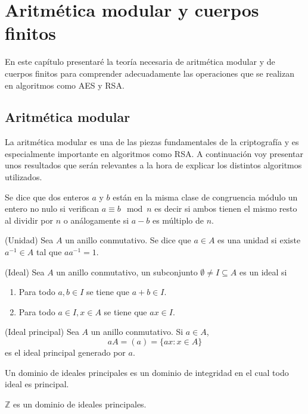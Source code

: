 \chapter{Aritmética modular y cuerpos finitos}
\label{chap:tres}

En este capítulo presentaré la teoría necesaria de aritmética modular y de cuerpos finitos para comprender adecuadamente las operaciones que se realizan en algoritmos como AES y RSA.

\section{Aritmética modular}
La aritmética modular es una de las piezas fundamentales de la criptografía y es especialmente importante en algoritmos como RSA. A continuación voy presentar unos resultados  que serán relevantes a la hora de explicar los distintos algoritmos utilizados.
\begin{definicion}
	Se dice que dos enteros $a$ y $b$ están en la misma clase de congruencia módulo un entero no nulo si verifican $a \equiv b \mod n$ es decir si ambos tienen el mismo resto al dividir por $n$ o análogamente si $a-b$ es múltiplo de $n$.
\end{definicion}
\begin{definicion}
	(Unidad) Sea $A$ un anillo conmutativo. Se dice que $a\in A$ es una unidad si existe $a^{-1} \in A$ tal que $aa^{-1}=1$.
\end{definicion}
\begin{definicion}
	(Ideal) Sea $A$ un anillo conmutativo, un subconjunto $\emptyset \neq I \subseteq A$ es un ideal si
	\begin{enumerate}
		\item Para todo $a, b \in I$ se tiene que $a+b \in I$.
		\item Para todo $a\in I,x\in A$ se tiene que $ax\in I$.
	\end{enumerate}
\end{definicion}
\begin{definicion}
	(Ideal principal) Sea $A$ un anillo conmutativo. Si $a\in A$,
	$$
		aA = (a) = \{ax:x\in A\}
	$$
	es el ideal principal generado por $a$.
\end{definicion}
\begin{definicion}
	Un dominio de ideales principales es un dominio de integridad en el cual todo ideal es principal.
\end{definicion}
\begin{teorema}
	$\mathbb{Z}$ es un dominio de ideales principales.
\end{teorema}
